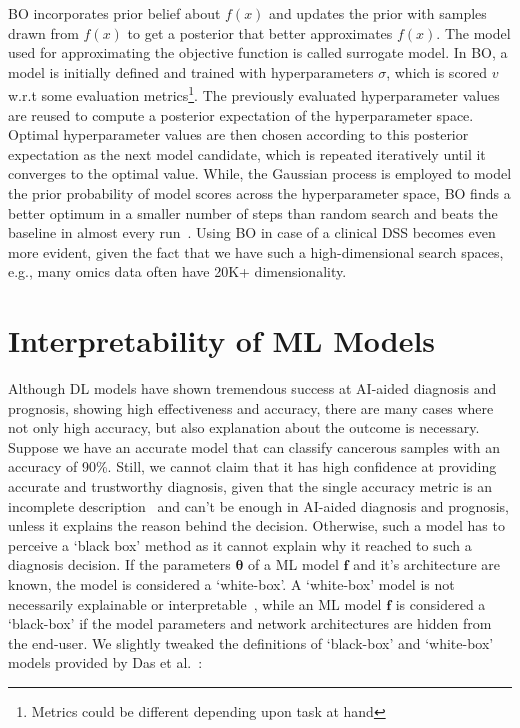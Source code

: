 \hspace*{3.5mm} BO incorporates prior belief about $f(x)$ and updates the prior with samples drawn from $f(x)$ to get a posterior that better approximates $f(x)$. The model used for approximating the objective function is called surrogate model. In BO, a model is initially defined and trained with hyperparameters $\sigma$, which is scored $v$ w.r.t some evaluation metrics\footnote{Metrics could be different depending upon task at hand}. The previously evaluated hyperparameter values are reused to compute a posterior expectation of the hyperparameter space. Optimal hyperparameter values are then chosen according to this posterior expectation as the next model candidate, which is repeated iteratively until it converges to the optimal value. While, the Gaussian process is employed to model the prior probability of model scores across the hyperparameter space,  
BO finds a better optimum in a smaller number of steps than random search and beats the baseline in almost every run~\cite{BO}. Using BO in case of a clinical DSS becomes even more evident, given the fact that we have such a high-dimensional search spaces, e.g., many omics data often have 20K+ dimensionality. 

\section{Interpretability of ML Models}
Although DL models have shown tremendous success at AI-aided diagnosis and prognosis, showing high effectiveness and accuracy, there are many cases where not only high accuracy, but also explanation about the outcome is necessary. Suppose we have an accurate model that can classify cancerous samples with an accuracy of 90\%. Still, we cannot claim that it has high confidence at providing accurate and trustworthy diagnosis, given that the single accuracy metric is an incomplete description~\cite{doshi2017towards} and can't be enough in AI-aided diagnosis and prognosis, unless it explains the reason behind the  decision. Otherwise, such a model has to perceive a `black box' method as it cannot explain why it reached to such a diagnosis decision. %
If the parameters $\boldsymbol{\theta}$ of a ML model $\boldsymbol{f}$ and it's architecture are known, the model is considered a `white-box'. %
A `white-box' model is not necessarily explainable or interpretable~\cite{das2020opportunities}, while an ML model $\boldsymbol{f}$ is considered a `black-box' if the model parameters and network architectures are hidden from the end-user. We slightly tweaked the definitions of `black-box' and `white-box' models provided by Das et al.~\cite{das2020opportunities}: 

